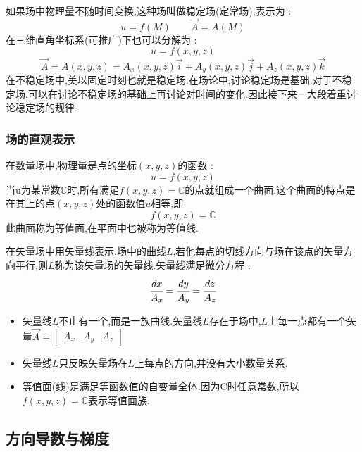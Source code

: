 \documentclass[UTF8,12pt]{ctexbook}
\newcommand{\defFunction}[1]{f(#1)}
\newcommand{\mathConstant}{\mathbb{C}}
\begin{document}
{{{{{      如果场中物理量不随时间变换,这种场叫做稳定场(定常场),表示为 :
      $$
        u= \defFunction{M}\qquad \vec{A} = A(M)
      $$
      在三维直角坐标系(可推广)下也可以分解为 :
      $$
        u= \defFunction{x,y,z}
      $$
      $$
        \vec{A} = A(x,y,z) = A_x(x,y,z)\vec{i} + A_y(x,y,z)\vec{j} + A_z(x,y,z)\vec{k}
      $$
      在不稳定场中,美以固定时刻也就是稳定场.在场论中,讨论稳定场是基础.对于不稳定场,可以在讨论不稳定场的基础上再讨论对时间的变化.因此接下来一大段着重讨论稳定场的规律.
    }%

    \subsubsection{场的直观表示}{
      在数量场中,物理量是点的坐标$(x,y,z)$的函数 :
      $$
        u = \defFunction{x,y,z}
      $$
      当u为某常数$\mathConstant$时,所有满足$\defFunction{x,y,z} = \mathConstant$的点就组成一个曲面.这个曲面的特点是在其上的点$(x,y,z)$处的函数值$u$相等,即
      $$
        \defFunction{x,y,z} = \mathConstant
      $$
      此曲面称为等值面,在平面中也被称为等值线.

      在矢量场中用矢量线表示.场中的曲线$L$,若他每点的切线方向与场在该点的矢量方向平行,则$L$称为该矢量场的矢量线.矢量线满足微分方程 :
      $$
        \cfrac{dx}{A_x} = \cfrac{dy}{A_y} = \cfrac{dz}{A_z}
      $$

      \begin{itemize}
        \item 矢量线$L$不止有一个,而是一族曲线.矢量线$L$存在于场中,$L$上每一点都有一个矢量$\vec{A} = \begin{bmatrix}
                  A_x & A_y & A_z
                \end{bmatrix}$
        \item 矢量线$L$只反映矢量场在$L$上每点的方向,并没有大小数量关系.
        \item 等值面(线)是满足等函数值的自变量全体.因为C时任意常数,所以$\defFunction{x,y,z} = \mathConstant$表示等值面族.
      \end{itemize}
    }%

  }%

  \subsection{方向导数与梯度}{

}}}}
\end{document}
